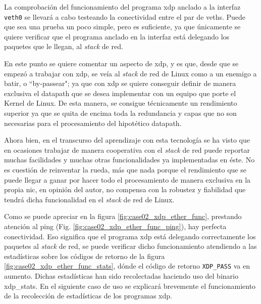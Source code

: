 La comprobación del funcionamiento del programa \gls{xdp} anclado a la interfaz \texttt{veth0} se llevará a cabo testeando la conectividad entre el par de \gls{veth}s. Puede que sea una prueba un poco simple, pero es suficiente, ya que únicamente se quiere verificar que el programa anclado en la interfaz está delegando los paquetes que le llegan, al \textit{stack} de red.\\
\par

En este punto se quiere comentar un aspecto de \gls{xdp}, y es que, desde que se empezó a trabajar con \gls{xdp}, se veía al \textit{stack} de red de Linux como a un enemigo a batir, o ``by-passear"; ya que con \gls{xdp} se quiere conseguir definir de manera exclusiva el datapath que se desea implementar con un equipo que porte el Kernel de Linux.  De esta manera, se consigue técnicamente un rendimiento superior ya que se quita de encima toda la redundancia y capas que no son necesarias para el procesamiento del hipotético datapath.\\
\par
Ahora bien, en el transcurso del aprendizaje con esta tecnología se ha visto que en ocasiones trabajar de manera cooperativa con el \textit{stack} de red puede reportar muchas facilidades y muchas otras funcionalidades ya implementadas en éste. No es cuestión de reinventar la rueda, más que nada porque el rendimiento que se puede llegar a ganar por hacer todo el procesamiento de manera exclusiva en la propia \gls{nic}, en opinión del autor, no compensa con la robustez y fiabilidad que tendrá dicha funcionalidad en el \textit{stack} de red de Linux.\\
\par
Como se puede apreciar en la figura \ref{fig:case02_xdp_ether_func}, prestando atención al ping   (Fig. \ref{fig:case02_xdp_ether_func_ping}), hay perfecta conectividad. Eso significa que el programa \gls{xdp} está delegando correctamente los paquetes al \textit{stack} de red, se puede verificar dicho funcionamiento atendiendo a las estadísticas sobre los códigos de retorno de la figura \ref{fig:case02_xdp_ether_func_stats}, dónde el código de retorno \texttt{XDP\_PASS} va en aumento. Dichas estadísticas han sido recolectadas haciendo uso del binario xdp\_stats. En el siguiente caso de uso se explicará brevemente el funcionamiento de la recolección de estadísticas de los programas \gls{xdp}. 
\newpage

